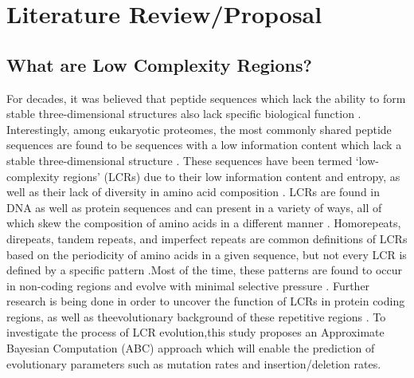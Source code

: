 \documentclass{article}
\begin{document}
                        
\newpage
%

\section{Literature Review/Proposal}
\subsection{What are Low Complexity Regions?}
For decades, it was believed that peptide sequences which lack the ability to form stable three-dimensional structures also lack specific biological function \citep{haerty2010low}. Interestingly, among eukaryotic proteomes, the most commonly
shared peptide sequences are found to be sequences with a low information content which lack a stable three-dimensional
structure \citep{haerty2010low, marcotte1999census, bannen2007effect}. These sequences have been termed ‘low-
complexity regions’ (LCRs) due to their low information content and entropy, as well as their lack of diversity in amino acid
composition \citep{wootton1993statistics, coletta2010low}. LCRs are found in DNA as well as protein sequences and can
present in a variety of ways, all of which skew the composition of amino acids in a different manner \citep{wootton1993statistics, mier2020disentangling}. Homorepeats, direpeats, tandem repeats, and imperfect repeats are common definitions of LCRs based
on the periodicity of amino acids in a given sequence, but not every LCR is defined by a specific pattern \citep{mier2020disentangling}.Most of the time, these patterns are found to occur in non-coding regions and evolve with minimal selective pressure \citep{kruglyak2000distribution}. Further research is being done in order to uncover the function of LCRs in protein coding regions, as well as theevolutionary background of these repetitive regions \citep{huntley2006selection}. To investigate the process of LCR evolution,this study proposes an Approximate Bayesian Computation (ABC) approach which will enable the prediction of evolutionary
parameters such as mutation rates and insertion/deletion rates.
\end{document}
